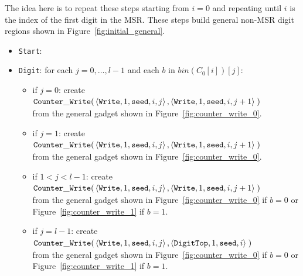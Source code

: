The idea here is to repeat these steps starting from $i = 0$ and repeating until $i$ is the index of the first digit in the MSR. These
steps build general non-MSR digit regions shown in Figure~\ref{fig:initial_general}.


\begin{itemize}
    \item {\tt Start}:

    \item {\tt Digit}: for each $j=0,\ldots,l-1$ and each $b$ in $bin(C_0[i])[j]$:
    \begin{itemize}
        \item if $j = 0$: create
        $\begin{aligned}[t]
            {\tt Counter\_Write}(&\left\langle {\tt Write}, 1, {\tt seed}, i, j \right\rangle, \left\langle {\tt Write}, 1, {\tt seed}, i, j + 1 \right\rangle \;)
        \end{aligned}$\\from the general gadget shown in Figure~\ref{fig:counter_write_0}.

        \item if $j = 1$: create
        $\begin{aligned}[t]
            {\tt Counter\_Write}(&\left\langle {\tt Write}, 1, {\tt seed}, i, j \right\rangle, \left\langle {\tt Write}, 1, {\tt seed}, i, j + 1 \right\rangle \;)
        \end{aligned}$\\from the general gadget shown in Figure~\ref{fig:counter_write_0}.

        \item if $1 < j < l-1$: create
        $\begin{aligned}[t]
            {\tt Counter\_Write}(&\left\langle {\tt Write}, 1, {\tt seed}, i, j \right\rangle, \left\langle {\tt Write}, 1, {\tt seed}, i, j + 1 \right\rangle \;)
        \end{aligned}$\\from the general gadget shown in Figure~\ref{fig:counter_write_0} if $b = 0$ or Figure~\ref{fig:counter_write_1} if $b = 1$.

        \item if $j = l-1$: create
        $\begin{aligned}[t]
            {\tt Counter\_Write}(&\left\langle {\tt Write}, 1, {\tt seed}, i, j \right\rangle, \left\langle {\tt DigitTop}, 1, {\tt seed}, i \right\rangle \;)
        \end{aligned}$\\from the general gadget shown in Figure~\ref{fig:counter_write_0} if $b = 0$ or Figure~\ref{fig:counter_write_1} if $b = 1$.
    \end{itemize}



\end{itemize}
